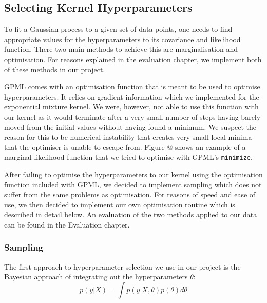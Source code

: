 \documentclass[a4paper,12pt,twoside,openright]{report}
\begin{document}



\subsection{Selecting Kernel Hyperparameters} 

To fit a Gaussian process to a given set of data points, one needs to find appropriate values for the hyperparameters to its covariance and likelihood function. There two main methods to achieve this are marginalisation and optimisation. For reasons explained in the evaluation chapter, we implement both of these methods in our project.

GPML comes with an optimisation function that is meant to be used to optimise hyperparameters. It relies on gradient information which we implemented for the exponential mixture kernel. We were, however, not able to use this function with our kernel as it would terminate after a very small number of steps having barely moved from the initial values without having found a minimum. We suspect the reason for this to be numerical instability that creates very small local minima that the optimiser is unable to escape from. Figure @ shows an example of a marginal likelihood function that we tried to optimise with GPML's \texttt{minimize}.

After failing to optimise the hyperparameters to our kernel using the optimisation function included with GPML, we decided to implement sampling which does not suffer from the same problems as optimisation. For reasons of speed and ease of use, we then decided to implement our own optimisation routine which is described in detail below. An evaluation of the two methods applied to our data can be found in the Evaluation chapter.


\subsubsection{Sampling}
The first approach to hyperparameter selection we use in our project is the Bayesian approach of integrating out the hyperparameters $\theta$:
\begin{equation}
p(y|X) = \int p(y|X,\theta)p(\theta)d\theta
\end{equation}
\end{document}
